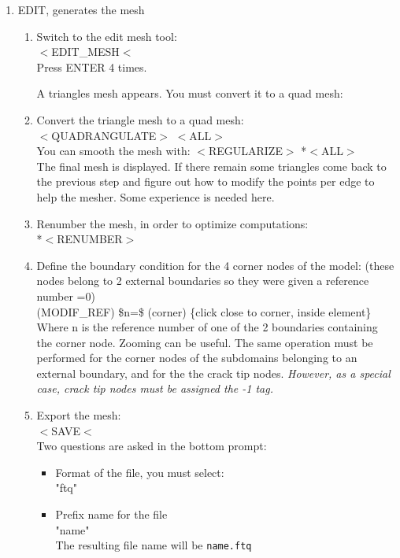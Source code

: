 \begin{enumerate}[STEP I:]
\begin{enumerate}[1.]
  \end{enumerate}

\item EDIT, generates the mesh

  \begin{enumerate}[1.]

  \item Switch to the edit mesh tool: \\
	\textsf{$<$EDIT\_MESH$<$} \\
   Press ENTER 4 times.

A triangles mesh appears. You must convert it to a quad mesh:

  \item Convert the triangle mesh to a quad mesh: \\
	\textsf{$<$QUADRANGULATE$>$ $<$ALL$>$} \\
   You can smooth the mesh with:
	\textsf{$<$REGULARIZE$>$ *$<$ALL$>$}	 \\

The final mesh is displayed. 
If there remain some triangles come back to the previous step
and figure out how to modify the points per edge to help
the mesher. Some experience is needed here.

  \item Renumber the mesh, in order to optimize computations: \\
	\textsf{*$<$RENUMBER$>$}

  \item Define the boundary condition for the 4 corner nodes of the model:
   (these nodes belong to 2 external boundaries so they were given
   a reference number =0) \\
        \textsf{(MODIF\_REF) \$n=\$ (corner) \{click close to corner, inside element\}} \\
   Where n is the reference number of one of the 2 boundaries containing
   the corner node. Zooming can be useful.
   The same operation must be performed for the corner nodes of the 
   subdomains belonging to an external boundary, and for the
   the crack tip nodes. \emph{However, as a special case, crack tip nodes must 
   be assigned the -1 tag.}
 
  \item Export the mesh: \\
	\textsf{$<$SAVE$<$} \\
   Two questions are asked in the bottom prompt:
   \begin{itemize}
    \item Format of the file, you must select: \\
	\textsf{"ftq"}
    \item Prefix name for the file \\
        \textsf{"name"}\\
          The resulting file name will be \texttt{name.ftq}
   \end{itemize}
  
  \end{enumerate}

\end{enumerate}


